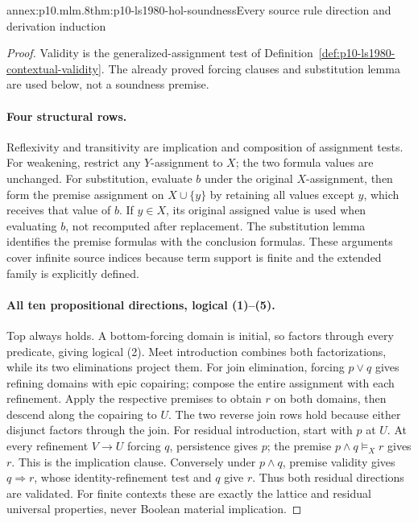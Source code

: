 \begin{annexitem}{annex:p10.mlm.8}{thm:p10-ls1980-hol-soundness}{Every source rule direction and derivation induction}
\begin{proof}
Validity is the generalized-assignment test of
Definition~\ref{def:p10-ls1980-contextual-validity}. The already proved forcing
clauses and substitution lemma are used below, not a soundness premise.

\paragraph{Four structural rows.}
Reflexivity and transitivity are implication and composition of assignment
tests. For weakening, restrict any \(Y\)-assignment to \(X\); the two formula
values are unchanged. For substitution, evaluate \(b\) under the original
\(X\)-assignment, then form the premise assignment on \(X\cup\{y\}\) by
retaining all values except \(y\), which receives that value of \(b\).
If \(y\in X\), its original assigned value is used when evaluating \(b\),
not recomputed after replacement. The substitution lemma identifies the
premise formulas with the conclusion formulas. These arguments cover
infinite source indices because term support is finite and the extended
family is explicitly defined.

\paragraph{All ten propositional directions, logical (1)--(5).}
Top always holds. A bottom-forcing domain is initial, so factors through
every predicate, giving logical (2). Meet introduction combines both
factorizations, while its two eliminations project them.
For join elimination, forcing \(p\vee q\) gives refining domains with epic
copairing; compose the entire assignment with each refinement. Apply the
respective premises to obtain \(r\) on both domains, then descend along
the copairing to \(U\). The two reverse join rows hold because either
disjunct factors through the join.
For residual introduction, start with \(p\) at \(U\). At every refinement
\(V\to U\) forcing \(q\), persistence gives \(p\); the premise
\(p\wedge q\models_Xr\) gives \(r\). This is the implication clause.
Conversely under \(p\wedge q\), premise validity gives \(q\Rightarrow r\),
whose identity-refinement test and \(q\) give \(r\). Thus both residual
directions are validated. For finite contexts these are exactly the lattice
and residual universal properties, never Boolean material implication.


\end{proof}
\end{annexitem}
